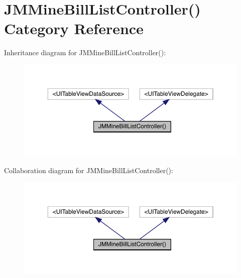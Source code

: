 \hypertarget{category_j_m_mine_bill_list_controller_07_08}{}\section{J\+M\+Mine\+Bill\+List\+Controller() Category Reference}
\label{category_j_m_mine_bill_list_controller_07_08}


Inheritance diagram for J\+M\+Mine\+Bill\+List\+Controller()\+:\nopagebreak
\begin{figure}[H]
\begin{center}
\leavevmode
\includegraphics[width=350pt]{category_j_m_mine_bill_list_controller_07_08__inherit__graph}
\end{center}
\end{figure}


Collaboration diagram for J\+M\+Mine\+Bill\+List\+Controller()\+:\nopagebreak
\begin{figure}[H]
\begin{center}
\leavevmode
\includegraphics[width=350pt]{category_j_m_mine_bill_list_controller_07_08__coll__graph}
\end{center}
\end{figure}
